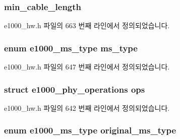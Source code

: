 \subsubsection[{\texorpdfstring{min\+\_\+cable\+\_\+length}{min_cable_length}}]{ min\+\_\+cable\+\_\+length}\hypertarget{structe1000__phy__info_ac4841f23f526b1ae761416e51dbb03b0}{}\label{structe1000__phy__info_ac4841f23f526b1ae761416e51dbb03b0}


e1000\+\_\+hw.\+h 파일의 663 번째 라인에서 정의되었습니다.

\subsubsection[{\texorpdfstring{ms\+\_\+type}{ms_type}}]{\setlength{\rightskip}{0pt plus 5cm}enum {\bf e1000\+\_\+ms\+\_\+type} ms\+\_\+type}\hypertarget{structe1000__phy__info_ae903e4f11d17a2c115411d89a6816398}{}\label{structe1000__phy__info_ae903e4f11d17a2c115411d89a6816398}


e1000\+\_\+hw.\+h 파일의 647 번째 라인에서 정의되었습니다.

\subsubsection[{\texorpdfstring{ops}{ops}}]{\setlength{\rightskip}{0pt plus 5cm}struct {\bf e1000\+\_\+phy\+\_\+operations} ops}\hypertarget{structe1000__phy__info_a60c9cd1642eed1c082fd37283740fdc9}{}\label{structe1000__phy__info_a60c9cd1642eed1c082fd37283740fdc9}


e1000\+\_\+hw.\+h 파일의 642 번째 라인에서 정의되었습니다.

\subsubsection[{\texorpdfstring{original\+\_\+ms\+\_\+type}{original_ms_type}}]{\setlength{\rightskip}{0pt plus 5cm}enum {\bf e1000\+\_\+ms\+\_\+type} original\+\_\+ms\+\_\+type}\hypertarget{structe1000__phy__info_a7786be3a20936ae07e10797f5dc0c0ed}{}\label{structe1000__phy__info_a7786be3a20936ae07e10797f5dc0c0ed}


